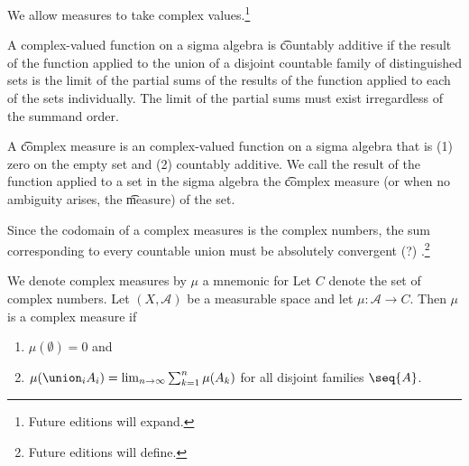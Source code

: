 

We allow measures to take complex values.\footnote{Future editions will expand.}


A complex-valued
function on a
sigma algebra is
\t{countably additive}
if the result of the function applied to
the union of a disjoint countable family of
distinguished sets is the limit of the partial
sums of the results of the function applied
to each of the sets individually.
The limit of the partial sums must
exist irregardless of the summand order.

A \t{complex measure} is an complex-valued function on a sigma algebra that is
(1) zero on the empty set and
(2) countably additive.
We call the result of the function applied to a set in the sigma algebra the \t{complex measure} (or when no ambiguity arises, the \t{measure}) of the set.

Since the codomain of
a complex measures is
the complex numbers,
the sum corresponding
to every countable union
must be absolutely convergent (?)
.\footnote{Future editions will define.}


We denote complex measures by $\mu$
a mnemonic for 
Let $C$ denote the set
of complex numbers.
Let
$(X, \mathcal{A})$
be a measurable space
and let
$\mu: \mathcal{A} \to C$.
Then $\mu$ is a complex measure if
\begin{enumerate}
  \item $\mu(\emptyset) = 0$ and
  \item
  $\mu(\union_{i} A_i) =
    \lim_{n \to \infty}
      \sum_{k = 1}^{n} \mu(A_k)$
  for all disjoint families $\seq{A}$.
\end{enumerate}
